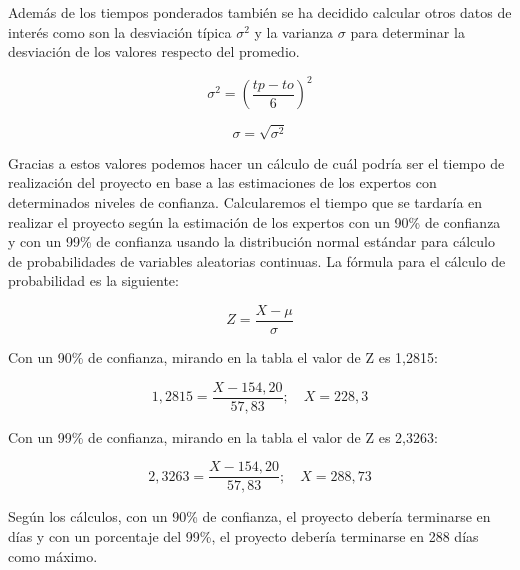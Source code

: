         Además de los tiempos ponderados también se ha decidido calcular otros datos de interés como son la desviación típica $\sigma^2$ y la varianza $\sigma$ para determinar la desviación de los valores respecto del promedio.

        \begin{equation}
            \sigma^2 = \left(\frac{tp - to}{6}\right)^2 \label{eq:varianza}
        \end{equation}
        
        \begin{equation}
            \sigma = \sqrt{\sigma^2} \label{eq:desviacion}
        \end{equation}
        
        
        Gracias a estos valores podemos hacer un cálculo de cuál podría ser el tiempo de realización del proyecto en base a las estimaciones de los expertos con determinados niveles de confianza. Calcularemos el tiempo que se tardaría en realizar el proyecto según la estimación de los expertos con un 90\% de confianza y con un 99\% de confianza usando la distribución normal estándar para cálculo de probabilidades de variables aleatorias continuas. La fórmula para el cálculo de probabilidad es la siguiente:
        
        \begin{equation}
            Z = \frac{X - \mu}{\sigma} \label{eq:probabilidad}
        \end{equation}
        
        Con un 90\% de confianza, mirando en la tabla el valor de Z es 1,2815:
        
        \[
        1,2815 = \frac{X - 154,20}{57,83}; \quad X = 228,3
        \]
        
        Con un 99\% de confianza, mirando en la tabla el valor de Z es 2,3263:
        
        \[
        2,3263 = \frac{X - 154,20}{57,83}; \quad X = 288,73
        \]
        
        Según los cálculos, con un 90\% de confianza, el proyecto debería terminarse en  días y con un porcentaje del 99\%, el proyecto debería terminarse en 288 días como máximo.
        

